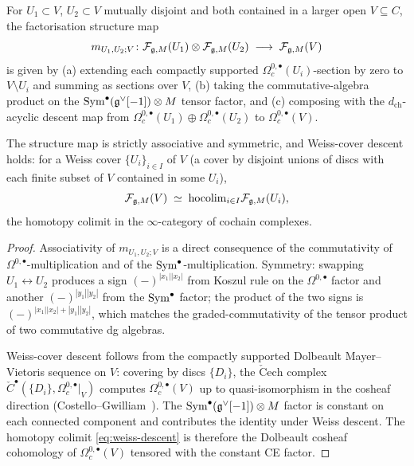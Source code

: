 \begin{theorem}
\label{thm:ch-ce-weiss-descent}
%
For $U_1\subset V$, $U_2\subset V$ mutually disjoint and both
contained in a larger open $V\subseteq C$, the factorisation structure
map
\begin{equation}
\label{eq:structure-map-nested}
m_{U_1,U_2;V}\colon
\mathcal{F}_{\mathfrak{g},M}(U_1)\otimes\mathcal{F}_{\mathfrak{g},M}(U_2)
\;\longrightarrow\;
\mathcal{F}_{\mathfrak{g},M}(V)
\end{equation}
is given by (a) extending each compactly supported
$\Omega^{0,\bullet}_c(U_i)$-section by zero to $V\setminus U_i$ and
summing as sections over $V$, (b) taking the
commutative-algebra product on the $\mathrm{Sym}^\bullet(\mathfrak{g}^\vee[-1])\otimes
M$ tensor factor, and (c) composing with the $d_{\mathrm{ch}}$-acyclic
descent map from
$\Omega^{0,\bullet}_c(U_1)\oplus\Omega^{0,\bullet}_c(U_2)$ to
$\Omega^{0,\bullet}_c(V)$.

The structure map is strictly associative and symmetric, and
Weiss-cover descent holds: for a Weiss cover $\{U_i\}_{i\in I}$ of $V$
(a cover by disjoint unions of discs with each finite subset of $V$
contained in some $U_i$),
\begin{equation}
\label{eq:weiss-descent}
\mathcal{F}_{\mathfrak{g},M}(V)
\;\simeq\;
\mathrm{hocolim}_{i\in I}\mathcal{F}_{\mathfrak{g},M}(U_i),
\end{equation}
the homotopy colimit in the $\infty$-category of cochain complexes.
\end{theorem}

\begin{proof}
Associativity of $m_{U_1,U_2;V}$ is a direct consequence of the
commutativity of $\Omega^{0,\bullet}$-multiplication and of the
$\mathrm{Sym}^\bullet$-multiplication. Symmetry: swapping $U_1\leftrightarrow
U_2$ produces a sign $(-)^{|x_1||x_2|}$ from Koszul rule on the
$\Omega^{0,\bullet}$ factor and another $(-)^{|y_1||y_2|}$ from the
$\mathrm{Sym}^\bullet$ factor; the product of the two signs is
$(-)^{|x_1||x_2|+|y_1||y_2|}$, which matches the graded-commutativity
of the tensor product of two commutative dg algebras.

Weiss-cover descent follows from the compactly supported Dolbeault
Mayer--Vietoris sequence on $V$: covering by discs $\{D_i\}$, the
$\mathrm{\check{C}ech}$ complex
$\check C^\bullet(\{D_i\},\Omega^{0,\bullet}_c|_V)$ computes
$\Omega^{0,\bullet}_c(V)$ up to quasi-isomorphism in the cosheaf
direction (Costello--Gwilliam~\cite[Prop.\,4.3.4]{CG17}). The
$\mathrm{Sym}^\bullet(\mathfrak{g}^\vee[-1])\otimes M$ factor is constant on each
connected component and contributes the identity under Weiss descent.
The homotopy colimit \eqref{eq:weiss-descent} is therefore the
Dolbeault cosheaf cohomology of $\Omega^{0,\bullet}_c(V)$ tensored with
the constant CE factor.
\end{proof}


